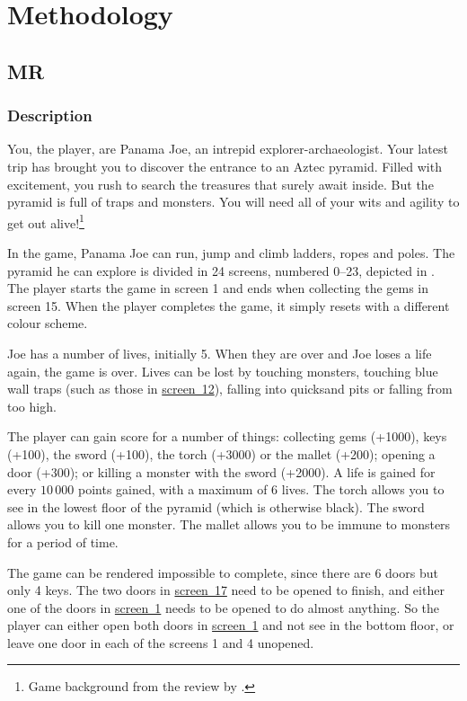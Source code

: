 \newcommand{\refscreen}[1]{\hyperref[fig:montezuma-map]{screen~#1}}
\chapter{Methodology}
\section{\acl{MR}}
\subsection{Description\label{subsec:mr-description}}
You, the player, are Panama Joe, an intrepid explorer-archaeologist. Your latest
trip has brought you to discover the entrance to an Aztec pyramid. Filled with
excitement, you rush to search the treasures that surely await inside. But the
pyramid is full of traps and monsters. You will need all of your wits and agility to
get out alive!\footnote{Game background from the review by \citet{adair2007montezuma}.}

In the game, Panama Joe can run, jump and climb ladders, ropes and poles. The
pyramid he can explore is divided in 24 screens, numbered 0--23, depicted in
. The player starts the game in screen 1 and ends when
collecting the gems in screen 15. When the player completes the game, it simply
resets with a different colour scheme.

Joe has a number of lives, initially 5. When they are over and Joe loses a life
again, the game is over. Lives can be lost by touching monsters, touching blue
wall traps (such as those in \refscreen{12}), falling
into quicksand pits or falling from too high.

The player can gain score for a number of things: collecting gems (+1000),
keys (+100), the sword (+100), the torch (+3000) or the mallet (+200); opening a
door (+300); or killing a monster with the sword (+2000). A life
is gained for every $10\,000$ points gained, with a maximum of 6 lives. The
torch allows you to see in the lowest floor of the pyramid (which is otherwise
black). The sword allows you to kill one monster. The mallet allows you to be
immune to monsters for a period of time.

The game can be rendered impossible to complete, since there are 6 doors but
only 4 keys. The two doors in \refscreen{17} need to be opened to finish, and
either one of the doors in \refscreen{1} needs to be opened to do almost
anything. So the player can either open both doors in \refscreen{1} and not see
in the bottom floor, or leave one door in each of the screens 1 and 4 unopened.

